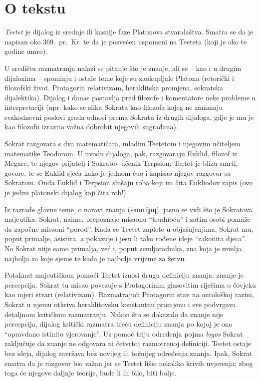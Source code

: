 


\section*{O tekstu}

\textit{Teetet} je dijalog iz srednje ili kasnije faze Platonova stvaralaštva. Smatra se da je napisan oko 369.\ pr.~Kr. te da je posvećen uspomeni na Teeteta (koji je oko te godine umro).
 
U središtu razmatranja nalazi se pitanje što je znanje, ali se – kao i u drugim dijalozima – spominju i ostale teme koje su zaokupljale Platona (retorički i filozofski život, Protagorin relativizam, heraklitska promjena, sokratska dijalektika). Dijalog i danas postavlja pred filozofe i komentatore neke probleme u interpretaciji (npr. kako se slika Sokrata kao filozofa kojeg ne zanimaju svakodnevni poslovi grada odnosi prema Sokratu iz drugih dijaloga, gdje je mu je kao filozofu izrazito važna dobrobit njegovih sugrađana). 

Sokrat razgovara s dva matematičara, mladim Teetetom i njegovim učiteljem matematike Teodorom. U uvodu dijaloga, pak, razgovaraju Euklid, filozof iz Megare, te njegov prijatelj i Sokratov učenik Terpsion; Teetet je blizu smrti, govore, te se Euklid sjeća kako je jednom čuo i zapisao njegov razgovor sa Sokratom. Onda Euklid i Terpsion slušaju roba koji im čita Eukliodov zapis (ovo je jedini platonski dijalog koji čita rob!).

Iz razrade glavne teme, o naravi znanja (ἐπιστήμη), jasno se vidi što je Sokratova majeutika. Sokrat, naime, prepoznaje misaonu ``trudnoću'' i zatim osobi pomaže da započne misaoni ``porod''. Kada se Teetet zaplete u objašnjenjima, Sokrat mu, poput primalje, asistira, a pokazuje i jesu li tako rođene ideje ``zakonita djeca''. No Sokrat niije samo primalja, već i, poput zemljoradnika, zna koja je zemlja najbolja za koje sjeme te kada je najbolje vrijeme za žetvu.

Potaknut majeutičkom pomoći Teetet iznosi drugu definiciju znanja: znanje je percepcija. Sokrat tu misao povezuje s Protagorinim glasovitim riječima o čovjeku kao mjeri stvari (relativizam). Razmatrajući Protagorin stav na ontološkoj razini, Sokrat u njemu otkriva heraklitovsku konstantnu promjenu i sve podvrgava detaljnom kritičkom razmatranju. Nakon što se dokazalo da znanje nije percepcija, dijalog kritički razmatra treću definiciju znanja po kojoj je ono ``opravdano istinito vjerovanje''. Uz pomoć triju određenja pojma \textit{logos} Sokrat zaključuje da znanje ne odgovara ni četvrtoj razmotrenoj definiciji. Teetet ostaje bez ideja, dijalog završava bez novijeg ili točnijeg određenja znanja. Ipak, Sokrat smatra da je razgovor bio važan jer se Teetet lišio nekoliko krivih uvjerenja; zbog toga će njegove daljnje teorije, bude li ih bilo, biti bolje.


